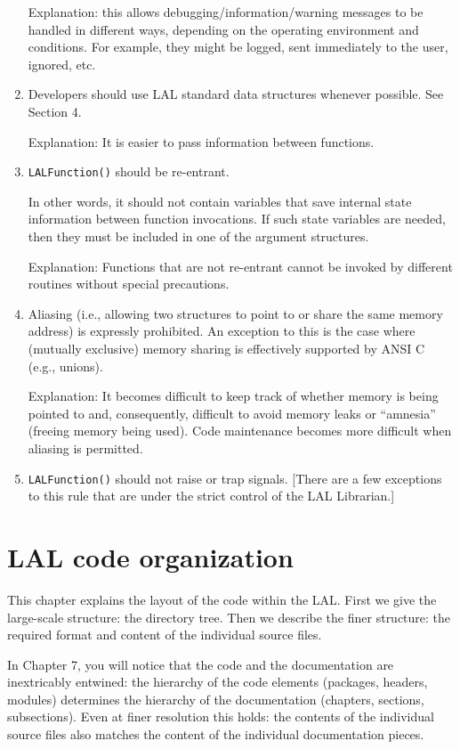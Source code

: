 \documentclass[]{ligodcc}
\begin{document}
\begin{enumerate}
Explanation: this allows debugging/information/warning messages to be
handled in different ways, depending on the operating environment and
conditions. For example, they might be logged, sent immediately to the
user, ignored, etc.


\item
Developers should use LAL standard data structures whenever
possible. See Section 4.

Explanation: It is easier to pass information between functions.

\item
{\tt LALFunction()} should be re-entrant.


In other words, it should not contain variables that save internal
state information between function invocations. If such state
variables are needed, then they must be included in one of the argument structures.

Explanation: Functions that are not re-entrant cannot be invoked by
different routines without special precautions.

\item
Aliasing (i.e., allowing two structures to point to or share
the same memory address) is expressly prohibited. An exception to this
is the case where (mutually exclusive) memory sharing is effectively
supported by ANSI C (e.g., unions).

Explanation: It becomes difficult to keep track of whether memory is
being pointed to and, consequently, difficult to avoid memory leaks
or ``amnesia''  (freeing memory being used). Code maintenance becomes
more difficult when aliasing is permitted.

\item
{\tt LALFunction()} should not raise  or trap signals. 
[There are a few exceptions to this rule that are under the 
strict control of the LAL Librarian.]

\end{enumerate}


\section{LAL code organization}
\label{sec:lalcode}

This chapter explains the layout of the code within the LAL. First we
give the large-scale structure: the directory tree.  Then we
describe the finer structure: the required format and content of the
individual source files.  

In Chapter 7, you will notice that the code and the  documentation are
inextricably entwined: the hierarchy  of the code elements (packages,
headers, modules)  determines the hierarchy of the documentation
(chapters, sections, subsections).  Even at finer resolution this
holds:  the contents of the individual source files also matches the
content of the individual documentation pieces.
\end{document}
